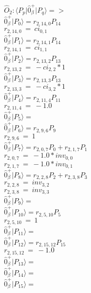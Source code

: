 \documentclass[14pt]{article}
\begin{document}
    $\hat{O}_{2}:  \langle{P_p}\vert \hat{0}_{\beta}^{+} \vert{P_q}\rangle => $ \\ 
    $ \hat{0}_{\beta}^{+} \vert{P_{0}}\rangle = {r}_{2,14,0}P_{14} $ \\ 
    ${r}_{2,14,0}\ =\ {ci}_{0,1} $ \\ 
    $ \hat{0}_{\beta}^{+} \vert{P_{1}}\rangle = {r}_{2,14,1}P_{14} $ \\ 
    ${r}_{2,14,1}\ =\ {ci}_{1,1} $ \\ 
    $ \hat{0}_{\beta}^{+} \vert{P_{2}}\rangle = {r}_{2,13,2}P_{13} $ \\ 
    ${r}_{2,13,2}\ =\ -{ci}_{2,2}*1 $ \\ 
    $ \hat{0}_{\beta}^{+} \vert{P_{3}}\rangle = {r}_{2,13,3}P_{13} $ \\ 
    ${r}_{2,13,3}\ =\ -{ci}_{3,2}*1 $ \\ 
    $ \hat{0}_{\beta}^{+} \vert{P_{4}}\rangle = {r}_{2,11,4}P_{11} $ \\ 
    ${r}_{2,11,4}\ =\ -1.0 $ \\ 
    $ \hat{0}_{\beta}^{+} \vert{P_{5}}\rangle =  $ \\ 
    $ \hat{0}_{\beta}^{+} \vert{P_{6}}\rangle = {r}_{2,9,6}P_{9} $ \\ 
    ${r}_{2,9,6}\ =\ 1 $ \\ 
    $ \hat{0}_{\beta}^{+} \vert{P_{7}}\rangle = {r}_{2,0,7}P_{0}+{r}_{2,1,7}P_{1} $ \\ 
    ${r}_{2,0,7}\ =\ -1.0*{inv}_{0,0} $ \\ 
    ${r}_{2,1,7}\ =\ -1.0*{inv}_{0,1} $ \\ 
    $ \hat{0}_{\beta}^{+} \vert{P_{8}}\rangle = {r}_{2,2,8}P_{2}+{r}_{2,3,8}P_{3} $ \\ 
    ${r}_{2,2,8}\ =\ {inv}_{3,2} $ \\ 
    ${r}_{2,3,8}\ =\ {inv}_{3,3} $ \\ 
    $ \hat{0}_{\beta}^{+} \vert{P_{9}}\rangle =  $ \\ 
    $ \hat{0}_{\beta}^{+} \vert{P_{10}}\rangle = {r}_{2,5,10}P_{5} $ \\ 
    ${r}_{2,5,10}\ =\ 1 $ \\ 
    $ \hat{0}_{\beta}^{+} \vert{P_{11}}\rangle =  $ \\ 
    $ \hat{0}_{\beta}^{+} \vert{P_{12}}\rangle = {r}_{2,15,12}P_{15} $ \\ 
    ${r}_{2,15,12}\ =\ -1.0 $ \\ 
    $ \hat{0}_{\beta}^{+} \vert{P_{13}}\rangle =  $ \\ 
    $ \hat{0}_{\beta}^{+} \vert{P_{14}}\rangle =  $ \\ 
    $ \hat{0}_{\beta}^{+} \vert{P_{15}}\rangle =  $ \\ 
    
\end{document}
